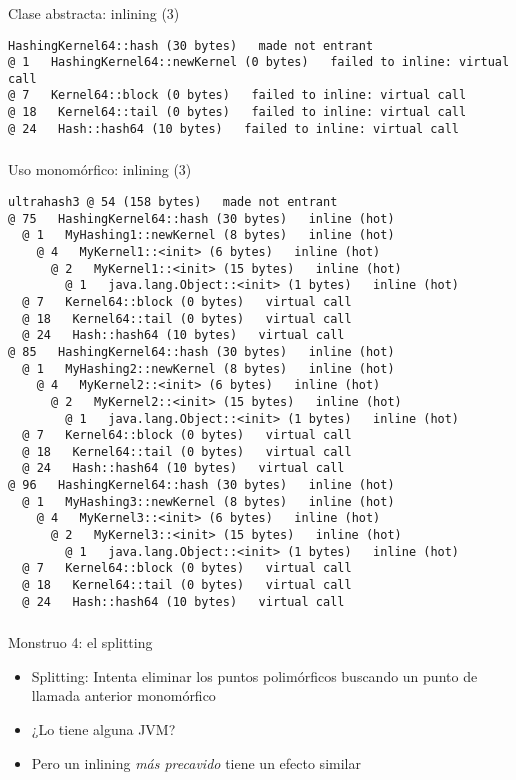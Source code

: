 \begin{frame}[fragile]
  \frametitle{\ft}
  \begin{block}{Clase abstracta: inlining (3)}
    \begin{lstlisting}[basicstyle=\tiny]
HashingKernel64::hash (30 bytes)   made not entrant
@ 1   HashingKernel64::newKernel (0 bytes)   failed to inline: virtual call
@ 7   Kernel64::block (0 bytes)   failed to inline: virtual call
@ 18   Kernel64::tail (0 bytes)   failed to inline: virtual call
@ 24   Hash::hash64 (10 bytes)   failed to inline: virtual call
    \end{lstlisting}
  \end{block}
\end{frame}


\begin{frame}[fragile]
  \frametitle{\ft}
  \begin{block}{Uso monomórfico: inlining (3)}
    \begin{lstlisting}[basicstyle=\tiny]
ultrahash3 @ 54 (158 bytes)   made not entrant
@ 75   HashingKernel64::hash (30 bytes)   inline (hot)
  @ 1   MyHashing1::newKernel (8 bytes)   inline (hot)
    @ 4   MyKernel1::<init> (6 bytes)   inline (hot)
      @ 2   MyKernel1::<init> (15 bytes)   inline (hot)
        @ 1   java.lang.Object::<init> (1 bytes)   inline (hot)
  @ 7   Kernel64::block (0 bytes)   virtual call
  @ 18   Kernel64::tail (0 bytes)   virtual call
  @ 24   Hash::hash64 (10 bytes)   virtual call
@ 85   HashingKernel64::hash (30 bytes)   inline (hot)
  @ 1   MyHashing2::newKernel (8 bytes)   inline (hot)
    @ 4   MyKernel2::<init> (6 bytes)   inline (hot)
      @ 2   MyKernel2::<init> (15 bytes)   inline (hot)
        @ 1   java.lang.Object::<init> (1 bytes)   inline (hot)
  @ 7   Kernel64::block (0 bytes)   virtual call
  @ 18   Kernel64::tail (0 bytes)   virtual call
  @ 24   Hash::hash64 (10 bytes)   virtual call
@ 96   HashingKernel64::hash (30 bytes)   inline (hot)
  @ 1   MyHashing3::newKernel (8 bytes)   inline (hot)
    @ 4   MyKernel3::<init> (6 bytes)   inline (hot)
      @ 2   MyKernel3::<init> (15 bytes)   inline (hot)
        @ 1   java.lang.Object::<init> (1 bytes)   inline (hot)
  @ 7   Kernel64::block (0 bytes)   virtual call
  @ 18   Kernel64::tail (0 bytes)   virtual call
  @ 24   Hash::hash64 (10 bytes)   virtual call
    \end{lstlisting}
  \end{block}
\end{frame}


\begin{frame}[fragile]
  \frametitle{\ft}
  \begin{block}{Monstruo 4: el splitting}
    \begin{itemize}
    \item Splitting: Intenta eliminar los puntos polimórficos buscando
      un punto de llamada anterior monomórfico
    \item ¿Lo tiene alguna JVM?
    \item Pero un inlining {\it más precavido} tiene un efecto similar
    \end{itemize}
  \end{block}
\end{frame}


